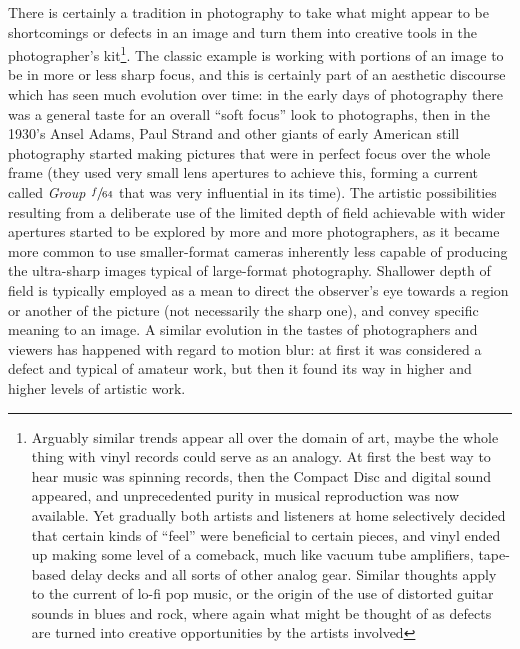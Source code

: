 There is certainly a tradition in photography to take what might appear to be shortcomings
or defects in an image and turn them into creative tools in the photographer's kit\footnote{
	Arguably similar trends appear all over the domain of art, maybe the whole thing with vinyl records
	could serve as an analogy. At first the best way to hear music was spinning records, then
	the Compact Disc and digital sound appeared, and unprecedented purity in musical reproduction
	was now available. Yet gradually both artists and listeners at home selectively decided that
	certain kinds of ``feel'' were beneficial to certain pieces, and vinyl ended up making some level
	of a comeback, much like vacuum tube amplifiers, tape-based delay decks and all sorts of other
	analog gear. Similar thoughts apply to the current of lo-fi pop music, or the origin of the
	use of distorted guitar sounds in blues and rock, where again what might be thought of as
	defects are turned into creative opportunities by the artists involved}.
The classic example is working with portions of an image to be in more or less sharp focus,
and this is certainly part of an aesthetic discourse which has seen much evolution over time: 
in the early days of photography there was a general taste for an overall ``soft focus'' look
to photographs, then in the 1930's Ansel Adams, Paul Strand and other giants of early American 
still photography started making pictures that were in perfect focus over the whole frame 
(they used very small lens apertures to achieve this, forming a current called 
\emph{Group $\sfrac{f}{64}$} that was very influential in its time). 
The artistic possibilities resulting from a deliberate use of the limited \gls{depth of field} 
achievable with wider \glspl{aperture} started to be explored by more and more photographers,
as it became more common to use smaller-format cameras inherently less capable of producing the
ultra-sharp images typical of large-format photography.
Shallower depth of field is typically employed as a mean to direct the observer's eye towards 
a region or another of the picture (not necessarily the sharp one), and convey specific meaning to an image. 
A similar evolution in the tastes of photographers and viewers has happened with regard to \gls{motion blur}:
at first it was considered a defect and typical of amateur work, 
but then it found its way in higher and higher levels of artistic work.

